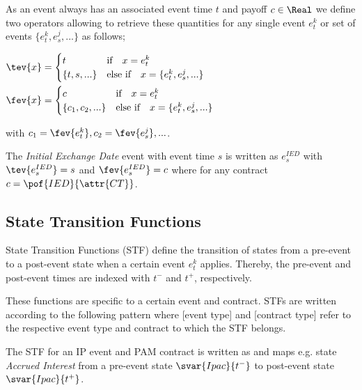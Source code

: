 As an event always has an associated event time $t$ and payoff $c\in\Real$ we define two operators allowing to retrieve these quantities for any single event $e_t^k$ or set of events $\{e_t^k,e_s^j, ...\}$ as follows;

{$\begin{aligned}
	\tev{x} &= \begin{cases} t & \text{if}\quad x=e_t^k \\
				\{t,s,...\} & \text{else if}\quad x=\{e_t^k,e_s^j,...\} \end{cases} \\
	\fev{x} &= \begin{cases} c & \text{if}\quad x=e_t^k \\
				\{c_1, c_2, ...\} & \text{else if}\quad x=\{e_t^k,e_s^j,...\} \end{cases}
\end{aligned}$}

with $c_1=\fev{e_t^k}, c_2=\fev{e_s^j}, ...$.

\begin{example}
The \textit{Initial Exchange Date} event with event time $s$ is written as $e_s^{IED}$ with $\tev{e_s^{IED}}=s$ and $\fev{e_s^{IED}}=c$ where for any contract  $c=\pof{IED}{\attr{CT}}$.
\end{example}


\subsection{State Transition Functions}\label{sec:stf}

State Transition Functions (STF) define the transition of states from a pre-event to a post-event state when a certain event $e_t^{k}$ applies. Thereby, the pre-event and post-event times are indexed with $t^-$ and $t^+$, respectively. 

These functions are specific to a certain event and contract. STFs are written according to the following pattern  where [event type] and [contract type] refer to the respective event type and contract to which the STF belongs.

\begin{example}
The STF for an IP event and PAM contract is written as  and maps e.g. state \textit{Accrued Interest} from a pre-event state $\svar{Ipac}{t^-}$ to post-event state $\svar{Ipac}{t^+}$.
\end{example}


